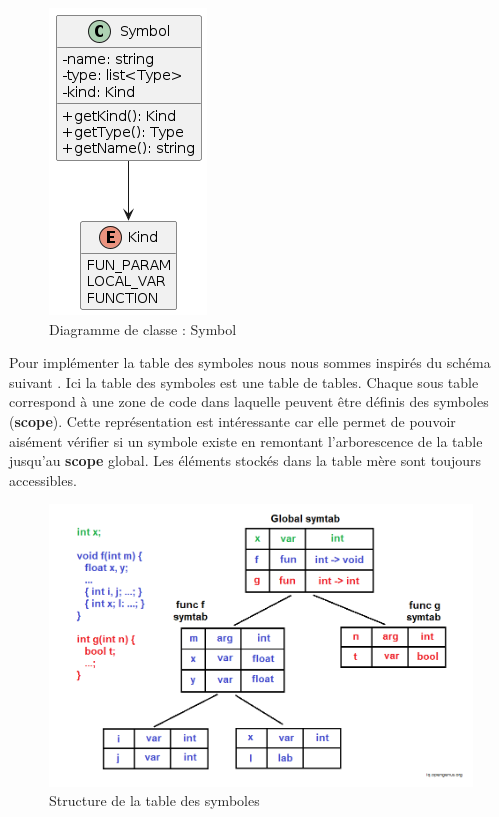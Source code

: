 \documentclass[a4paper]{article}%
\begin{document}
\begin{figure}[h!]
  \begin{center}
  \includegraphics[scale=0.5]{../ressources/diagrams/symbol.png}
  \caption{Diagramme de classe : Symbol}
  \end{center}
\end{figure}

Pour implémenter la table des symboles nous nous sommes inspirés du schéma
suivant \cite{symtableGenius}. Ici la table des symboles est une table de
tables. Chaque sous table correspond à une zone de code dans laquelle peuvent
être définis des symboles (\textbf{scope}). Cette représentation est
intéressante car elle permet de pouvoir aisément vérifier si un symbole existe
en remontant l'arborescence de la table jusqu'au \textbf{scope} global. Les
éléments stockés dans la table mère sont toujours accessibles.
\clearpage

\begin{figure}[h!]
  \begin{center}
  \includegraphics[scale=0.5]{./img/symtable.png}
  \caption{Structure de la table des symboles}
  \end{center}
\end{figure}
\end{document}
